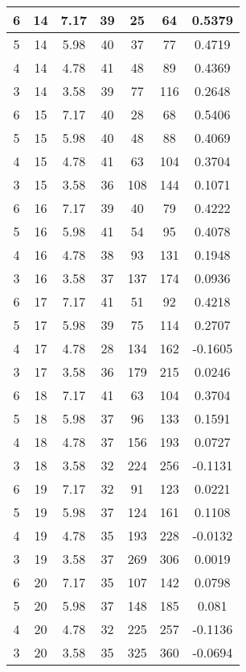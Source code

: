 \documentclass[letterpaper, 12pt]{article}
\begin{document}
\begin{longtable}{|c|c|c|c|c|c|c|}
\hline
6 & 14 & 7.17 & 39 & 25 & 64 & 0.5379 \\
\hline
5 & 14 & 5.98 & 40 & 37 & 77 & 0.4719 \\
\hline
4 & 14 & 4.78 & 41 & 48 & 89 & 0.4369 \\
\hline
3 & 14 & 3.58 & 39 & 77 & 116 & 0.2648 \\
\hline
6 & 15 & 7.17 & 40 & 28 & 68 & 0.5406 \\
\hline
5 & 15 & 5.98 & 40 & 48 & 88 & 0.4069 \\
\hline
4 & 15 & 4.78 & 41 & 63 & 104 & 0.3704 \\
\hline
3 & 15 & 3.58 & 36 & 108 & 144 & 0.1071 \\
\hline
6 & 16 & 7.17 & 39 & 40 & 79 & 0.4222 \\
\hline
5 & 16 & 5.98 & 41 & 54 & 95 & 0.4078 \\
\hline
4 & 16 & 4.78 & 38 & 93 & 131 & 0.1948 \\
\hline
3 & 16 & 3.58 & 37 & 137 & 174 & 0.0936 \\
\hline
6 & 17 & 7.17 & 41 & 51 & 92 & 0.4218 \\
\hline
5 & 17 & 5.98 & 39 & 75 & 114 & 0.2707 \\
\hline
4 & 17 & 4.78 & 28 & 134 & 162 & -0.1605 \\
\hline
3 & 17 & 3.58 & 36 & 179 & 215 & 0.0246 \\
\hline
6 & 18 & 7.17 & 41 & 63 & 104 & 0.3704 \\
\hline
5 & 18 & 5.98 & 37 & 96 & 133 & 0.1591 \\
\hline
4 & 18 & 4.78 & 37 & 156 & 193 & 0.0727 \\
\hline
3 & 18 & 3.58 & 32 & 224 & 256 & -0.1131 \\
\hline
6 & 19 & 7.17 & 32 & 91 & 123 & 0.0221 \\
\hline
5 & 19 & 5.98 & 37 & 124 & 161 & 0.1108 \\
\hline
4 & 19 & 4.78 & 35 & 193 & 228 & -0.0132 \\
\hline
3 & 19 & 3.58 & 37 & 269 & 306 & 0.0019 \\
\hline
6 & 20 & 7.17 & 35 & 107 & 142 & 0.0798 \\
\hline
5 & 20 & 5.98 & 37 & 148 & 185 & 0.081 \\
\hline
4 & 20 & 4.78 & 32 & 225 & 257 & -0.1136 \\
\hline
3 & 20 & 3.58 & 35 & 325 & 360 & -0.0694 \\
\hline
\end{longtable}
\end{document}
